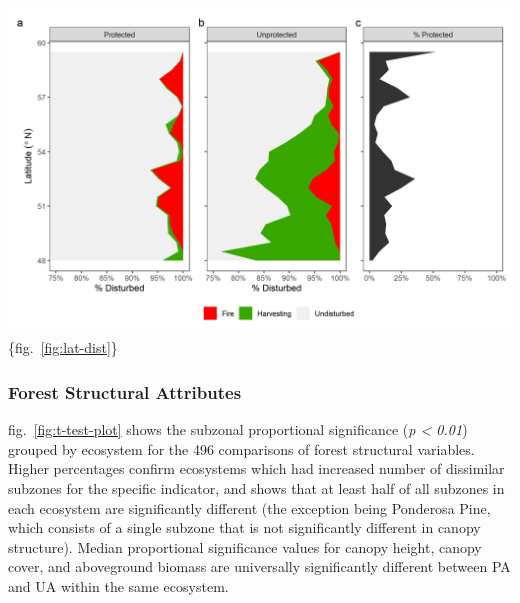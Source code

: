 \documentclass[11pt]{article}
\makeatletter
\def\maxwidth{\ifdim\Gin@nat@width>\linewidth\linewidth
\else\Gin@nat@width\fi}
\let\Oldincludegraphics\includegraphics
\renewcommand{\includegraphics}[1]{\Oldincludegraphics[width=\maxwidth]{#1}}
\makeatother
\begin{document}
\includegraphics{figures/latitude_disturbance_plot.png}\{fig.~\ref{fig:lat-dist}\}

\hypertarget{forest-structural-attributes-1}{%
\subsubsection{Forest Structural
Attributes}\label{forest-structural-attributes-1}}

fig.~\ref{fig:t-test-plot} shows the subzonal proportional significance
(\emph{p \textless{} 0.01}) grouped by ecosystem for the 496 comparisons
of forest structural variables. Higher percentages confirm ecosystems
which had increased number of dissimilar subzones for the specific
indicator, and shows that at least half of all subzones in each
ecosystem are significantly different (the exception being Ponderosa
Pine, which consists of a single subzone that is not significantly
different in canopy structure). Median proportional significance values
for canopy height, canopy cover, and aboveground biomass are universally
significantly different between PA and UA within the same ecosystem.
\end{document}
